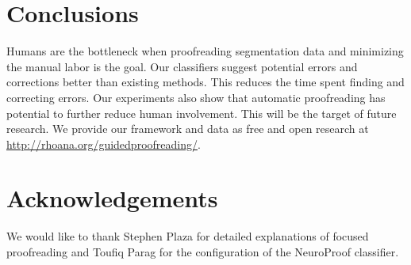 \section{Conclusions}

Humans are the bottleneck when proofreading segmentation data and minimizing the manual labor is the goal. Our classifiers suggest potential errors and corrections better than existing methods. This reduces the time spent finding and correcting errors.
Our experiments also show that automatic proofreading has potential to further reduce human involvement. This will be the target of future research. We provide our framework and data as free and open research at \url{http://rhoana.org/guidedproofreading/}.

\section*{Acknowledgements}
We would like to thank Stephen Plaza for detailed explanations of focused proofreading and Toufiq Parag for the configuration of the NeuroProof classifier.

